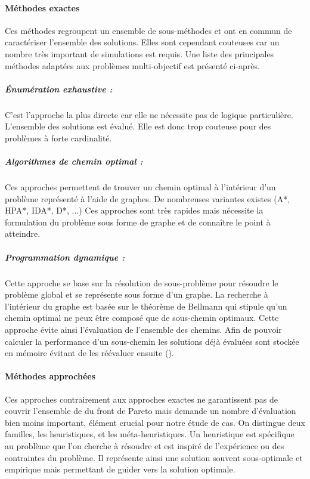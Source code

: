 \paragraph{Méthodes exactes} %
\label{par:methodes_exactes}
Ces méthodes regroupent un ensemble de sous-méthodes et ont en commun de caractériser
l’ensemble des solutions. Elles sont cependant couteuses car un nombre très important
de simulations est requis. Une liste des principales méthodes adaptées aux problèmes
multi-objectif est présenté ci-après.

\subparagraph{Énumération exhaustive :} %
\label{subp:enumeration_exhaustive}
C’est l’approche la plus directe car elle ne nécessite pas de logique particulière.
L’ensemble des solutions est évalué. Elle est donc trop couteuse pour des problèmes
à forte cardinalité.

\subparagraph{Algorithmes de chemin optimal :} %
\label{subp:algorithmes_de_chemin_optimal}
Ces approches permettent de trouver un chemin optimal à l’intérieur d’un problème
représenté à l’aide de graphes. De nombreuses variantes existes (A*, HPA*, IDA*, D*, ...)
Ces approches sont très rapides mais nécessite la formulation du problème sous forme
de graphe et de connaître le point à atteindre.


\subparagraph{Programmation dynamique :} %
\label{subp:programmation_dynamique}
Cette approche se base sur la résolution de sous-problème pour résoudre le problème global
et se représente sous forme d’un graphe. La recherche à l’intérieur du graphe est basée sur le théorème
de Bellmann qui stipule qu’un chemin optimal ne peux être composé que de sous-chemin
optimaux.  Cette approche évite ainsi l’évaluation de l’ensemble des chemins. Afin de
pouvoir calculer la performance d’un sous-chemin les solutions déjà évaluées sont
stockée en mémoire évitant de les réévaluer ensuite (\cite{Rivallain2013}).




\paragraph{Méthodes approchées} %
\label{par:methodes_approchees}
Ces approches contrairement aux approches exactes ne garantissent pas de couvrir
l’ensemble de du front de Pareto mais demande un nombre d’évaluation bien moins
important, élément crucial pour notre étude de cas. On distingue deux familles,
les heuristiques, et les méta-heuristiques.
Un heuristique est spécifique au problème que l’on cherche à résoudre et est
inspiré de l’expérience ou des contraintes du problème. Il représente ainsi une
solution souvent sous-optimale et empirique mais permettant de guider vers la solution
optimale.


